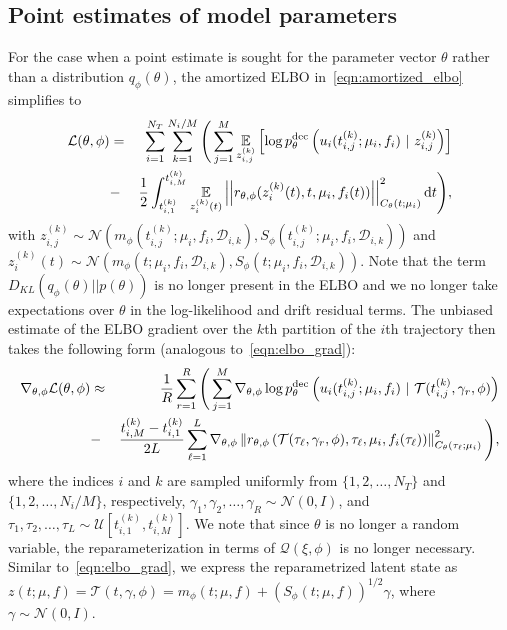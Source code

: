 \documentclass{article}
\begin{document}
	\subsection{Point estimates of model parameters} \label{sec:priorfree}
	
	For the case when a point estimate is sought for the parameter vector $\theta$ rather than a distribution $q_\phi(\theta)$, the amortized ELBO in~\eqref{eqn:amortized_elbo} simplifies to
	\begin{eqnarray} \label{eqn:priorfree_amortized_elbo}
		\mathcal{L}(\theta, \phi) & = & \sum_{i=1}^{N_T} 
		\sum_{k=1}^{N_i/M}
		\Bigg( \sum_{j=1}^{M} 
		\underset{ z_{i,j}^{(k)} }{\mathbb{E}}
		\left [ \log p_{\theta}^{\rm dec} \left ( u_{i}(t_{i,j}^{(k)};  \mu_i, f_i)\ |\ z_{i,j}^{(k)} \right )  \right ] \nonumber \\
		& - & \frac{1}{2} \int_{t_{i,1}^{(k)}}^{t_{i,M}^{(k)}}
		\underset{z_i^{(k)} (t)}{\mathbb{E}}
		\left | \left | r_{\theta, \phi} (z_i^{(k)}(t), t, \mu_i, f_i(t)) \right | \right |_{C_{\theta}(t;\mu_i)}^2 \text{d}t \Bigg),
	\end{eqnarray}
	with $z_{i,j}^{(k)} \sim \mathcal{N} ( m_\phi(t_{i,j}^{(k)}; \mu_i, f_i, \mathcal{D}_{i,k}), S_\phi (t_{i,j}^{(k)}; \mu_i, f_i, \mathcal{D}_{i,k}) )$ and $z_i^{(k)}(t) \sim \mathcal{N} ( m_\phi(t; \mu_i, f_i, \mathcal{D}_{i,k}), S_\phi (t; \mu_i, f_i, \mathcal{D}_{i,k}) )$.
	Note that the term $D_{KL}(q_\phi(\theta) || p(\theta))$ is no longer present in the ELBO and we no longer take expectations over $\theta$ in the log-likelihood and drift residual terms.
	The unbiased estimate of the ELBO gradient over the $k$th partition of the $i$th trajectory then takes the following form (analogous to~\eqref{eqn:elbo_grad}):
	\begin{eqnarray} \label{eqn:priorfree_elbo_grad}
		\nabla_{\theta,\phi} \mathcal{L}(\theta,\phi) & \approx & 
		\frac{1}{R}\sum_{r=1}^{R}
		\Bigg( \sum_{j=1}^{M}
		\nabla_{\theta,\phi}\log p_{\theta}^{\rm dec} \left ( u_{i}(t_{i,j}^{(k)};  \mu_i, f_i)\ |\ \mathcal{T}(t_{i,j}^{(k)},\gamma_r,\phi) \right ) \nonumber \\
		& - & \frac{t_{i,M}^{(k)}-t_{i,1}^{(k)}}{2L} 
		\sum_{\ell=1}^{L}
		\nabla_{\theta,\phi}\left\| r_{\theta, \phi} \left(\mathcal{T}(\tau_\ell,\gamma_{r},\phi), \tau_\ell, \mu_i, f_i(\tau_{\ell})\right) \right\|_{C_{\theta}(\tau_{\ell};\mu_i)}^2 \Bigg),
	\end{eqnarray}
	where the indices $i$ and $k$ are sampled uniformly from $\{1,2, \dots, N_T\}$ and $\{1, 2,\dots, N_i/M\}$, respectively, $\gamma_1, \gamma_2, \dots, \gamma_R \sim \mathcal{N}(0, I)$, and $\tau_1, \tau_2, \dots, \tau_L \sim \mathcal{U}[t_{i,1}^{(k)}, t_{i,M}^{(k)}]$. We note that since $\theta$ is no longer a random variable, the reparameterization in terms of $\mathcal{Q}(\xi, \phi)$ is no longer necessary. Similar to~\eqref{eqn:elbo_grad}, we express the reparametrized latent state as $z(t; \mu,f) = \mathcal{T}(t,\gamma,\phi)= m_\phi(t; \mu, f) + (S_\phi(t; \mu, f))^{1/2}\gamma$, where $\gamma \sim \mathcal{N}(0, I)$.  
	
\end{document}
